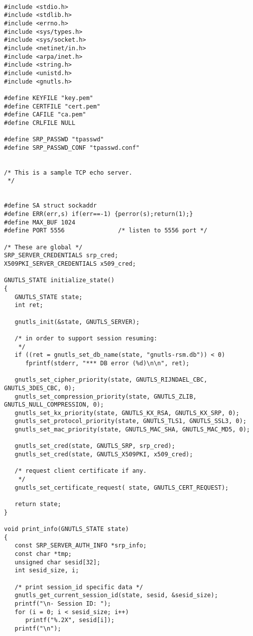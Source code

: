 \begin{verbatim}

#include <stdio.h>
#include <stdlib.h>
#include <errno.h>
#include <sys/types.h>
#include <sys/socket.h>
#include <netinet/in.h>
#include <arpa/inet.h>
#include <string.h>
#include <unistd.h>
#include <gnutls.h>

#define KEYFILE "key.pem"
#define CERTFILE "cert.pem"
#define CAFILE "ca.pem"
#define CRLFILE NULL

#define SRP_PASSWD "tpasswd"
#define SRP_PASSWD_CONF "tpasswd.conf"


/* This is a sample TCP echo server.
 */


#define SA struct sockaddr
#define ERR(err,s) if(err==-1) {perror(s);return(1);}
#define MAX_BUF 1024
#define PORT 5556               /* listen to 5556 port */

/* These are global */
SRP_SERVER_CREDENTIALS srp_cred;
X509PKI_SERVER_CREDENTIALS x509_cred;

GNUTLS_STATE initialize_state()
{
   GNUTLS_STATE state;
   int ret;

   gnutls_init(&state, GNUTLS_SERVER);

   /* in order to support session resuming:
    */
   if ((ret = gnutls_set_db_name(state, "gnutls-rsm.db")) < 0)
      fprintf(stderr, "*** DB error (%d)\n\n", ret);

   gnutls_set_cipher_priority(state, GNUTLS_RIJNDAEL_CBC, GNUTLS_3DES_CBC, 0);
   gnutls_set_compression_priority(state, GNUTLS_ZLIB, GNUTLS_NULL_COMPRESSION, 0);
   gnutls_set_kx_priority(state, GNUTLS_KX_RSA, GNUTLS_KX_SRP, 0);
   gnutls_set_protocol_priority(state, GNUTLS_TLS1, GNUTLS_SSL3, 0);
   gnutls_set_mac_priority(state, GNUTLS_MAC_SHA, GNUTLS_MAC_MD5, 0);

   gnutls_set_cred(state, GNUTLS_SRP, srp_cred);
   gnutls_set_cred(state, GNUTLS_X509PKI, x509_cred);

   /* request client certificate if any.
    */
   gnutls_set_certificate_request( state, GNUTLS_CERT_REQUEST);
   
   return state;
}

void print_info(GNUTLS_STATE state)
{
   const SRP_SERVER_AUTH_INFO *srp_info;
   const char *tmp;
   unsigned char sesid[32];
   int sesid_size, i;

   /* print session_id specific data */
   gnutls_get_current_session_id(state, sesid, &sesid_size);
   printf("\n- Session ID: ");
   for (i = 0; i < sesid_size; i++)
      printf("%.2X", sesid[i]);
   printf("\n");


\end{verbatim}
